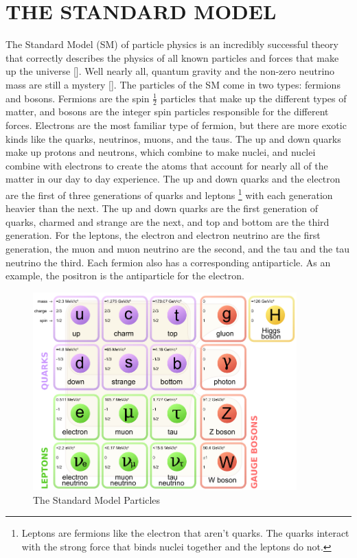 \chapter{THE STANDARD MODEL} \label{sm}

The Standard Model (SM) of particle physics is an incredibly successful theory that correctly describes the physics of all known particles and forces that make up the universe [\cite{smconsistency}]. Well nearly all, quantum gravity and the non-zero neutrino mass are still a mystery [\cite{smconsistency,smnograv,zee}]. The particles of the SM come in two types: fermions and bosons. Fermions are the spin $\frac{1}{2}$ particles that make up the different types of matter, and bosons are the integer spin particles responsible for the different forces. Electrons are the most familiar type of fermion, but there are more exotic kinds like the quarks, neutrinos, muons, and the taus. The up and down quarks make up protons and neutrons, which combine to make nuclei, and nuclei combine with electrons to create the atoms that account for nearly all of the matter in our day to day experience. The up and down quarks and the electron are the first of three generations of quarks and leptons \footnote{Leptons are fermions like the electron that aren't quarks. The quarks interact with the strong force that binds nuclei together and the leptons do not.} with each generation heavier than the next. The up and down quarks are the first generation of quarks, charmed and strange are the next, and top and bottom are the third generation. For the leptons, the electron and electron neutrino are the first generation, the muon and muon neutrino are the second, and the tau and the tau neutrino the third. Each fermion also has a corresponding antiparticle. As an example, the positron is the antiparticle for the electron. 

\begin{figure}[h!]
  \centering
  \includegraphics[width=4in]{images/Standard_Model_of_Elementary_Particles.png}
  \caption
   {The Standard Model Particles}
  \label{fig:smtable}
\end{figure}

